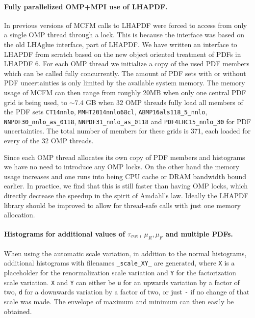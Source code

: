 \paragraph{Fully parallelized OMP+MPI use of LHAPDF.}

In previous versions of MCFM calls to LHAPDF were forced to access from only a single OMP thread
through a lock. This is because the interface was based on the old LHAglue interface, part
of LHAPDF. We have written an interface to LHAPDF from scratch based on the new object oriented treatment
of PDFs in LHAPDF 6. For each OMP thread we initialize a copy of the used PDF members which
can be called fully concurrently. The amount of PDF sets with or without PDF uncertainties is only limited
by the available system memory. The memory usage of MCFM can then range from roughly 20MB when only one central 
PDF grid is being used, to $\sim 7.4$ GB when 32 OMP threads fully load
all members of the PDF sets \texttt{CT14nnlo}, \texttt{MMHT2014nnlo68cl}, \texttt{ABMP16als118\_5\_nnlo},
 \texttt{NNPDF30\_nnlo\_as\_0118}, \texttt{NNPDF31\_nnlo\_as\_0118} and \texttt{PDF4LHC15\_nnlo\_30} for
 PDF uncertainties. The total number of members for these grids is 371, each loaded for every of the
 32 OMP threads.
 
Since each OMP thread allocates its own copy of PDF members and histograms we have no need to introduce
any OMP locks. On the other hand the memory usage increases and one runs into being CPU cache or DRAM
bandwidth bound earlier. In practice, we find that this is still faster than having OMP locks, which directly
decrease the speedup in the spirit of Amdahl's law. Ideally the LHAPDF library should be improved to allow for 
thread-safe calls with just one memory allocation.

\paragraph{Histograms for additional values of $\tau_{\text{cut}}$, $\mu_R,\mu_F$ and multiple PDFs.}
When using the automatic scale variation, in addition to the normal histograms, additional
histograms with filenames \texttt{\_scale\_XY\_} are generated, where \texttt{X} is a placeholder for the 
renormalization scale variation and \texttt{Y} for the factorization scale variation. \texttt{X} and \texttt{Y} can 
either be \texttt{u} for an upwards variation by a factor of two, \texttt{d} for a downwards variation by a factor of 
two, or just \texttt{-} if no change of that scale was made. The envelope of maximum and minimum can then easily be 
obtained.

